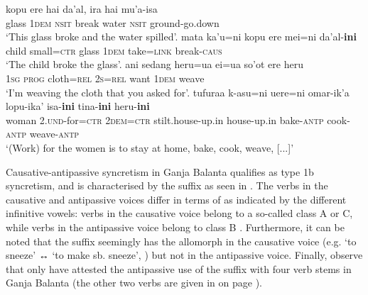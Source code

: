 \ea {} \citep[299, 340f.]{huber:2011}
\ea\label{ex:Makalero:break:a}
	\gll	kopu ere hai da’al, ira hai mu’a-isa \\
			glass \textsc{1dem} \textsc{nsit} break water \textsc{nsit} ground-go.down \\
	\glt	‘This glass broke and the water spilled’.
\ex\label{ex:Makalero:break:b}
	\gll	mata ka’u=ni kopu ere	mei=ni da’al-\textbf{ini} \\
			child small=\textsc{ctr} glass \textsc{1dem} take=\textsc{link} break-\textsc{caus} \\
	\glt	‘The child broke the glass’.
\ex\label{ex:Makalero:weave:a}
	\gll	ani sedang heru=ua ei=ua so’ot ere heru \\
			\textsc{1sg} \textsc{prog} cloth=\textsc{rel} \textsc{2s=rel} want \textsc{1dem} weave \\
	\glt	‘I’m weaving the cloth that you asked for’.
\ex\label{ex:Makalero:weave:b}
	\gll	tufuraa k-asu=ni uere=ni omar-ik’a lopu-ika’ isa-\textbf{ini} tina-\textbf{ini} heru-\textbf{ini} \\
			woman \textsc{2.und}-for=\textsc{ctr} \textsc{2dem=ctr} stilt.house-up.in house-up.in bake-\textsc{antp} cook-\textsc{antp} weave-\textsc{antp}\\
	\glt	‘(Work) for the women is to stay at home, bake, cook, weave, [...]’
	\z 
\z

Causative-antipassive syncretism in Ganja Balanta qualifies as type 1b syncretism, and is characterised by the suffix  as seen in . The verbs in the causative and antipassive voices differ in terms of  as indicated by the different infinitive vowels: verbs in the causative voice belong to a so-called class A or C, while verbs in the antipassive voice belong to class B \citep[142ff., 208, 211]{creissels:biaye:2016}. Furthermore, it can be noted that the suffix  seemingly has the allomorph  in the causative voice (e.g.  ‘to sneeze’ ↔  ‘to make sb. sneeze’, \citealt[209]{creissels:biaye:2016}) but not in the antipassive voice. Finally, observe that \citeauthor{creissels:biaye:2016} only have attested the antipassive use of the suffix  with four verb stems in Ganja Balanta (the other two verbs are given in  on page \pageref{tab:ch3:type1b-examples-2}).

